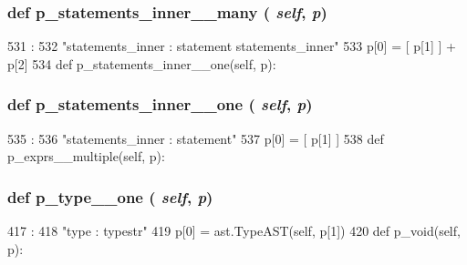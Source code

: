 \begin{DoxyVerb}
{\subsubsection[{p\_\-statements\_\-inner\_\-\_\-many}]{\setlength{\rightskip}{0pt plus 5cm}def p\_\-statements\_\-inner\_\-\_\-many ( {\em self}, \/   {\em p})}}
\label{classslicc_1_1parser_1_1SLICC_a3f2507fb0d5c325fe894124d2c338ec1}



\begin{DoxyCode}
531                                          :
532         "statements_inner : statement statements_inner"
533         p[0] = [ p[1] ] + p[2]
534 
    def p_statements_inner__one(self, p):
\end{DoxyCode}
\hypertarget{classslicc_1_1parser_1_1SLICC_a7efc1b878dacc061e3542ce6b8ab68c6}{
\subsubsection[{p\_\-statements\_\-inner\_\-\_\-one}]{\setlength{\rightskip}{0pt plus 5cm}def p\_\-statements\_\-inner\_\-\_\-one ( {\em self}, \/   {\em p})}}
\label{classslicc_1_1parser_1_1SLICC_a7efc1b878dacc061e3542ce6b8ab68c6}



\begin{DoxyCode}
535                                         :
536         "statements_inner : statement"
537         p[0] = [ p[1] ]
538 
    def p_exprs__multiple(self, p):
\end{DoxyCode}
\hypertarget{classslicc_1_1parser_1_1SLICC_a70796cbab50e66b568a4f47fbc1d9a7e}{
\subsubsection[{p\_\-type\_\-\_\-one}]{\setlength{\rightskip}{0pt plus 5cm}def p\_\-type\_\-\_\-one ( {\em self}, \/   {\em p})}}
\label{classslicc_1_1parser_1_1SLICC_a70796cbab50e66b568a4f47fbc1d9a7e}



\begin{DoxyCode}
417                             :
418         "type : typestr"
419         p[0] = ast.TypeAST(self, p[1])
420 
    def p_void(self, p):
\end{DoxyCode}
\hypertarget{classslicc_1_1parser_1_1SLICC_ab484be4a5214a30ffab2a0e34dcdbca6}{
}
\end{DoxyVerb}
